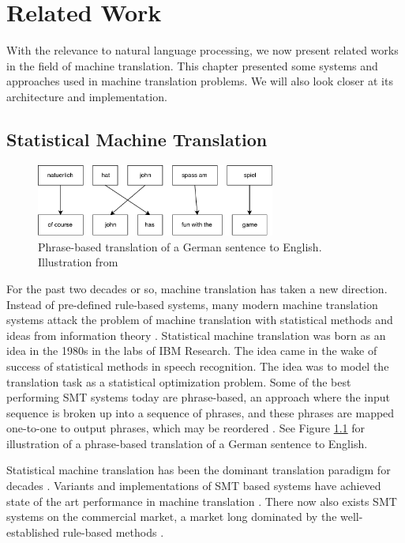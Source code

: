 
\chapter{Related Work}
\label{ch:related_work}
With the relevance to natural language processing, we now present related works in the field of machine translation. This chapter presented some systems and approaches used in machine translation problems. We will also look closer at its architecture and implementation.

\section{Statistical Machine Translation}
\begin{figure}[ht]
    \centering
    \includegraphics[width=0.7\textwidth]{fig/related_work/translation_de_en.pdf}
    \caption{Phrase-based translation of a German sentence to English. Illustration from \citep{koehn2010statistical}}
    \label{fig:translation-phrase-based}
\end{figure}

For the past two decades or so, machine translation has taken a new direction. Instead of pre-defined rule-based systems, many modern machine translation systems attack the problem of machine translation with statistical methods and ideas from information theory \citep{brown1990statistical}. Statistical machine translation was born as an idea in the 1980s in the labs of IBM Research. The idea came in the wake of success of statistical methods in speech recognition. The idea was to model the translation task as a statistical optimization problem. Some of the best performing SMT systems today are phrase-based, an approach where the input sequence is broken up into a sequence of phrases, and these phrases are mapped one-to-one to output phrases, which may be reordered \citep{koehn2010statistical}. See Figure \ref{fig:translation-phrase-based} for illustration of a phrase-based translation of a German sentence to English.

Statistical machine translation has been the dominant translation paradigm for decades \citep{wu2016google}. Variants and implementations of SMT based systems have achieved state of the art performance in machine translation \citep{watanabe07onlinelargemargin}. There now also exists SMT systems on the commercial market, a market long dominated by the well-established rule-based methods \citep{hutchins2007machine}.

